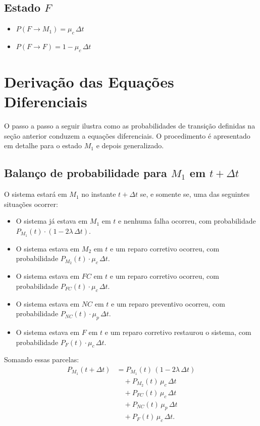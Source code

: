 \documentclass[12pt]{article}
\begin{document}
\subsection*{Estado $F$}
\begin{itemize}
    \item $P(F \to M_1) = \mu_c\,\Delta t$
    \item $P(F \to F)   = 1 - \mu_c\,\Delta t$
\end{itemize}

\newpage
\section{Derivação das Equações Diferenciais}

O passo a passo a seguir ilustra como as probabilidades de transição
definidas na seção anterior conduzem a equações diferenciais. O
procedimento é apresentado em detalhe para o estado $M_1$ e depois
generalizado.

\subsection*{Balanço de probabilidade para $M_1$ em $t + \Delta t$}

O sistema estará em $M_1$ no instante $t + \Delta t$ se, e somente se,
uma das seguintes situações ocorrer:

\begin{itemize}
    \item O sistema já estava em $M_1$ em $t$ e nenhuma falha ocorreu,
          com probabilidade $P_{M_1}(t)\cdot(1 - 2\lambda\,\Delta t)$.
    \item O sistema estava em $M_2$ em $t$ e um reparo corretivo ocorreu,
          com probabilidade $P_{M_2}(t)\cdot\mu_c\,\Delta t$.
    \item O sistema estava em $FC$ em $t$ e um reparo corretivo ocorreu,
          com probabilidade $P_{FC}(t)\cdot\mu_c\,\Delta t$.
    \item O sistema estava em $NC$ em $t$ e um reparo preventivo ocorreu,
          com probabilidade $P_{NC}(t)\cdot\mu_p\,\Delta t$.
    \item O sistema estava em $F$ em $t$ e um reparo corretivo restaurou
          o sistema, com probabilidade $P_{F}(t)\cdot\mu_c\,\Delta t$.
\end{itemize}

Somando essas parcelas:
\begin{align*}
P_{M_1}(t + \Delta t)
    &= P_{M_1}(t)\,(1 - 2\lambda\,\Delta t) \\
    &\quad + P_{M_2}(t)\,\mu_c\,\Delta t \\
    &\quad + P_{FC}(t)\,\mu_c\,\Delta t \\
    &\quad + P_{NC}(t)\,\mu_p\,\Delta t \\
    &\quad + P_{F}(t)\,\mu_c\,\Delta t.
\end{align*}
\end{document}
